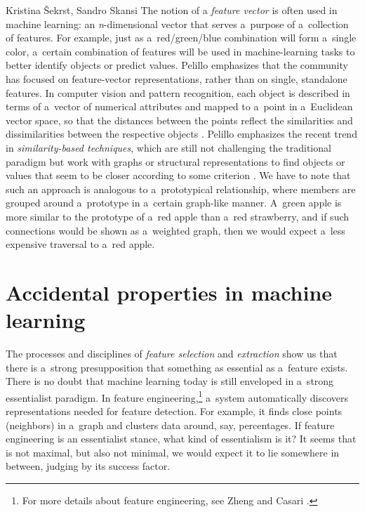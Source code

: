 \begin{artengenv2auth}{Kristina Šekrst, Sandro Skansi}
The notion of a \textit{feature vector} is often used in machine learning: an \textit{n}-dimensional vector that serves a~purpose of a~collection of features. For example, just as a~red/green/blue combination will form a~single color, a~certain combination of features will be used in machine-learning tasks to better identify objects or predict values. Pelillo
\parencite*[][p.3]{pelillo_introduction_2013} %
 emphasizes that the community has focused on feature-vector representations, rather than on single, standalone features. In computer vision and pattern recognition, each object is described in terms of a~vector of numerical attributes and mapped to a~point in a~Euclidean vector space, so that the distances between the points reflect the similarities and dissimilarities between the respective objects 
\parencite[][p.3]{pelillo_introduction_2013}. %
 Pelillo emphasizes the recent trend in \textit{similarity-based techniques}, which are still not challenging the traditional paradigm but work with graphs or structural representations to find objects or values that seem to be closer according to some criterion 
\parencite[][p.4]{pelillo_introduction_2013}. %
 We have to note that such an approach is analogous to a~prototypical relationship, where members are grouped around a~prototype in a~certain graph-like manner. A~green apple is more similar to the prototype of a~red apple than a~red strawberry, and if such connections would be shown as a~weighted graph, then we would expect a~less expensive traversal to a~red apple.

\section{Accidental properties in machine learning}
The processes and disciplines of \textit{feature selection} and \textit{extraction} show us that there is a~strong presupposition that something as essential as a~feature exists. There is no doubt that machine learning today is still enveloped in a~strong essentialist paradigm. In feature engineering,\footnote{For more details about feature engineering, see Zheng and Casari
\parencite*[][]{zheng_feature_2018}.%
} a~system automatically discovers representations needed for feature detection. For example, it finds close points (neighbors) in a~graph and clusters data around, say, percentages. If feature engineering is an essentialist stance, what kind of essentialism is it? It seems that is not maximal, but also not minimal, we would expect it to lie somewhere in between, judging by its success factor.


\end{artengenv2auth}

